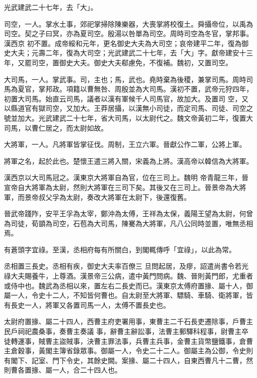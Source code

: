\begin{pinyinscope}
 光武建武二十七年，去「大」。



 司空，一人。掌水土事，郊祀掌掃除陳樂器，大喪掌將校復土。舜攝帝位，以禹為司空。契之子曰冥，亦為夏司空。殷湯以咎單為司空。周時司空為冬官，掌邦事。漢西京
 初不置。成帝綏和元年，更名御史大夫為大司空；哀帝建平二年，復為御史大夫；元壽二年，復為大司空；光武建武二十七年，去「大」字。獻帝建安十三年，又罷司空，置御史大夫。御史大夫郗慮免，不復補。魏初，又置司空。



 大司馬，一人。掌武事。司，主也；馬，武也。堯時棄為後稷，兼掌司馬。周時司馬為夏官，掌邦政。項籍以曹無咎、周殷並為大司馬。漢初不置，武帝元狩四年，初置大司馬。始直云司馬，議者以漢有軍候千人司馬官，故加大。及置司
 空，又以縣道官有獄司空，又加大。王莽居攝，以漢無小司徒，而定司馬、司徒、司空之號並加大。光武建武二十七年，省大司馬，以太尉代之。魏文帝黃初二年，復置大司馬，以曹仁居之，而太尉如故。



 大將軍，一人。凡將軍皆掌征伐。周制，王立六軍。晉獻公作二軍，公將上軍。



 將軍之名，起於此也。楚懷王遣三將入關，宋義為上將。漢高帝以韓信為大將軍。



 漢西京以大司馬冠之。漢東京大將軍自為官，位在三司上。魏明
 帝青龍三年，晉宣帝自大將軍為太尉，然則大將軍在三司下矣。其後又在三司上。晉景帝為大將軍，而景帝叔父孚為太尉，奏改大將軍在太尉下，後還復舊。



 晉武帝踐阼，安平王孚為太宰，鄭沖為太傅，王祥為太保，義陽王望為太尉，何曾為司徒，荀顗為司空，石苞為大司馬，陳騫為大將軍，凡八公同時並置，唯無丞相焉。



 有蒼頭字宜祿。至漢，丞相府每有所關白，到閣輒傳呼「宜祿」，以此為常。



 丞相置三長史。丞相有疾，御史大夫率百僚三
 旦問起居，及瘳，詔遣尚書令若光祿大夫賜養牛，上尊酒。漢景帝三公病，遣中黃門問病。魏、晉則黃門郎，尤重者或侍中也。魏武為丞相以來，置左右二長史而已。漢東京太傅府置掾、屬十人，御屬一人，令史十二人，不知皆何曹也。自太尉至大將軍、驃騎、車騎、衛將軍，皆有長史一人，將軍又各置司馬一人，太傅不置長史也。



 太尉府置掾、屬二十四人，西曹主府吏署用事，東曹主二千石長吏遷除事，戶曹主民戶祠祀農桑事，奏曹主奏議
 事，辭曹主辭訟事，法曹主郵驛科程事，尉曹主卒徒轉運事，賊曹主盜賊事，決曹主罪法事，兵曹主兵事，金曹主貨幣鹽鐵事，倉曹主倉穀事，黃閣主簿省錄眾事。御屬一人，令史二十二人。御屬主為公御，令史則有閣下、記室、門下令史，其餘史闕。案掾、屬二十四人，自東西曹凡十二曹，然則曹各置掾、屬一人，合二十四人也。




\end{pinyinscope}
